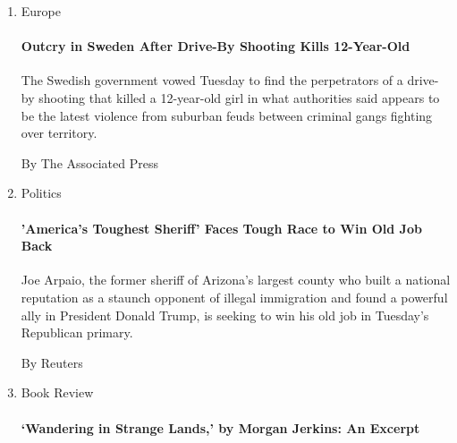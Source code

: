 \begin{enumerate}
\def\labelenumi{\arabic{enumi}.}
\item
  Europe

  \href{/aponline/2020/08/04/world/europe/ap-eu-sweden-killed-teenager.html?searchResultPosition=1}{}

  \hypertarget{outcry-in-sweden-after-drive-by-shooting-kills-12-year-old}{%
  \paragraph{Outcry in Sweden After Drive-By Shooting Kills
  12-Year-Old}\label{outcry-in-sweden-after-drive-by-shooting-kills-12-year-old}}

  The Swedish government vowed Tuesday to find the perpetrators of a
  drive-by shooting that killed a 12-year-old girl in what authorities
  said appears to be the latest violence from suburban feuds between
  criminal gangs fighting over territory.

  By The Associated Press
\item
  Politics

  \href{/reuters/2020/08/04/us/politics/04reuters-usa-election-arpaio.html?searchResultPosition=2}{}

  \hypertarget{americas-toughest-sheriff-faces-tough-race-to-win-old-job-back}{%
  \paragraph{'America's Toughest Sheriff' Faces Tough Race to Win Old
  Job
  Back}\label{americas-toughest-sheriff-faces-tough-race-to-win-old-job-back}}

  Joe Arpaio, the former sheriff of Arizona's largest county who built a
  national reputation as a staunch opponent of illegal immigration and
  found a powerful ally in President Donald Trump, is seeking to win his
  old job in Tuesday's Republican primary.

  By Reuters
\item
  Book Review

  \href{/2020/08/04/books/review/wandering-in-strange-lands-by-morgan-jerkins-an-excerpt.html?searchResultPosition=3}{}

  \hypertarget{wandering-in-strange-lands-by-morgan-jerkins-an-excerpt}{%
  \paragraph{`Wandering in Strange Lands,' by Morgan Jerkins: An
  Excerpt}\label{wandering-in-strange-lands-by-morgan-jerkins-an-excerpt}}


\end{enumerate}
